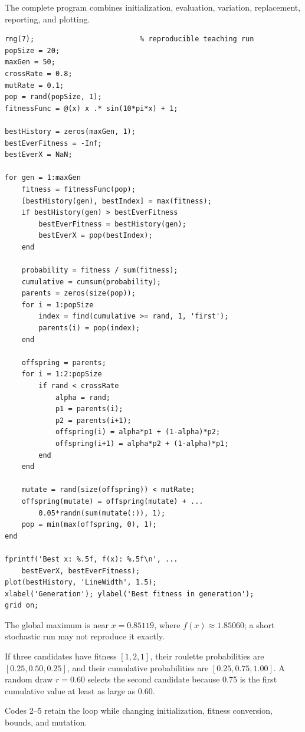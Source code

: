The complete program combines initialization, evaluation, variation, replacement, reporting, and plotting.

\begin{lstlisting}[style=mlmatlab]
rng(7);                         % reproducible teaching run
popSize = 20;
maxGen = 50;
crossRate = 0.8;
mutRate = 0.1;
pop = rand(popSize, 1);
fitnessFunc = @(x) x .* sin(10*pi*x) + 1;

bestHistory = zeros(maxGen, 1);
bestEverFitness = -Inf;
bestEverX = NaN;

for gen = 1:maxGen
    fitness = fitnessFunc(pop);
    [bestHistory(gen), bestIndex] = max(fitness);
    if bestHistory(gen) > bestEverFitness
        bestEverFitness = bestHistory(gen);
        bestEverX = pop(bestIndex);
    end

    probability = fitness / sum(fitness);
    cumulative = cumsum(probability);
    parents = zeros(size(pop));
    for i = 1:popSize
        index = find(cumulative >= rand, 1, 'first');
        parents(i) = pop(index);
    end

    offspring = parents;
    for i = 1:2:popSize
        if rand < crossRate
            alpha = rand;
            p1 = parents(i);
            p2 = parents(i+1);
            offspring(i) = alpha*p1 + (1-alpha)*p2;
            offspring(i+1) = alpha*p2 + (1-alpha)*p1;
        end
    end

    mutate = rand(size(offspring)) < mutRate;
    offspring(mutate) = offspring(mutate) + ...
        0.05*randn(sum(mutate(:)), 1);
    pop = min(max(offspring, 0), 1);
end

fprintf('Best x: %.5f, f(x): %.5f\n', ...
    bestEverX, bestEverFitness);
plot(bestHistory, 'LineWidth', 1.5);
xlabel('Generation'); ylabel('Best fitness in generation');
grid on;
\end{lstlisting}

The global maximum is near \(x=0.85119\), where \(f(x)\approx1.85060\); a short stochastic run may not reproduce it exactly.

\begin{workedexample}
If three candidates have fitness \([1,2,1]\), their roulette probabilities are \([0.25,0.50,0.25]\), and their cumulative probabilities are \([0.25,0.75,1.00]\). A random draw \(r=0.60\) selects the second candidate because 0.75 is the first cumulative value at least as large as 0.60.
\end{workedexample}

\begin{firstread}
Codes 2--5 retain the loop while changing initialization, fitness conversion, bounds, and mutation.
\end{firstread}

